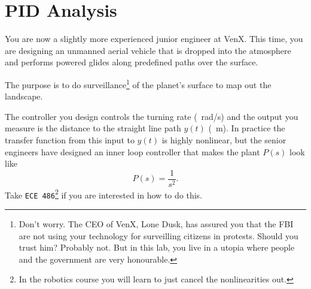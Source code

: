 \chapter{PID Analysis}\label{Lab:4}
You are now a slightly more experienced junior engineer at VenX.
This time, you are designing an unmanned aerial vehicle that is dropped into the atmosphere and performs powered glides along predefined paths over the surface.
%
\begin{center}
\end{center}
%
The purpose is to do surveillance\footnote{Don't worry. The CEO of VenX, Lone Dusk, has assured you that the FBI are not using your technology for surveilling citizens in protests. Should you trust him? Probably not. But in this lab, you live in a utopia where people and the government are very honourable.} of the planet's surface to map out the landscape.

The controller you design controls the turning rate (\SI{}{rad/s}) and the output you measure is the distance to the straight line path \(y(t)\) (\SI{}{m}).
In practice the transfer function from this input to \(y(t)\) is highly nonlinear, but the senior engineers have designed an inner loop controller that makes the plant \(P(s)\) look like
\[
  P(s) = \frac{1}{s^2}.
\]
Take \texttt{ECE 486}\footnote{In the robotics course you will learn to just cancel the nonlinearities out.} if you are interested in how to do this.

